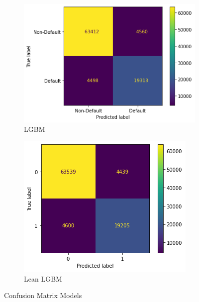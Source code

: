 \documentclass[twoside,11pt,a4paper]{article}
\begin{document}
\begin{figure}[h!]
\begin{subfigure}{0.4 \textwidth}
	\end{subfigure}
	\begin{subfigure}{0.4 \textwidth}
		\includegraphics[width=1\linewidth, height=0.8\linewidth]{cm_lgbm}
		\caption[Light Gradient Boosting Machine]{\acs{LGBM}}
		\label{fig:cm_lgbm}
	\end{subfigure}
	\hfill
		\begin{subfigure}{0.4 \textwidth}
		\includegraphics[width=1\linewidth, height=0.8\linewidth]{cm_lean_lgbm}
		\caption[Lean Light Gradient Boosting Machine]{Lean LGBM}
		\label{fig:cm_lean_lgbm}
	\end{subfigure}
	\caption[Confusion Matrix of Models]{Confusion Matrix Models}
	\label{fig:cm_ml}
\end{figure}
\end{document}
